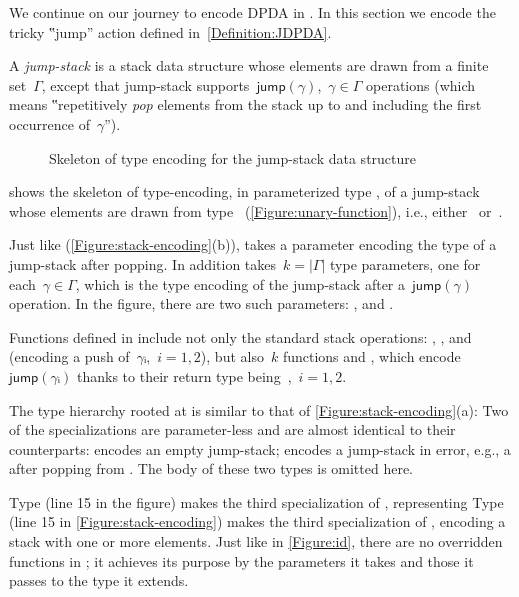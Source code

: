 We continue on our journey to encode DPDA in \Java.
In this section we encode the tricky ‟jump” action defined in~\cref{Definition:JDPDA}.

A \emph{jump-stack} is a stack data structure whose elements are drawn from a finite set~$Γ$,
  except that jump-stack supports~$\textsf{jump}(γ)$,~$γ∈Γ$ operations
  (which means ‟repetitively \emph{pop} elements from the stack up 
  to and including the first occurrence of~$γ$”).

\begin{wrapfigure}[18]{r}{42ex}
  \caption{Skeleton of type encoding for the jump-stack data structure}%
  \label{Figure:jump}%
  \lstset{style=numbered}
\end{wrapfigure}

 shows the skeleton of type-encoding, in parameterized type ,  
  of a jump-stack whose elements are drawn from type~
(\cref{Figure:unary-function}), i.e., either~ or~.

Just like  (\cref{Figure:stack-encoding}(b)),  takes 
  a  parameter encoding the type of a jump-stack after popping.
In addition  takes~$k=|Γ|$ type parameters, one for each~$γ∈Γ$,
  which is the type encoding of the jump-stack after a~$\textsf{jump}(γ)$
  operation.
In the figure, there are two such parameters: , and
  .

Functions defined in  include not only the standard stack operations: ,
,  and~ (encoding a push of~$γᵢ$,~$i=1,2$),
  but also~$k$ functions  and ,
  which encode~$\textsf{jump}(γᵢ)$
  thanks to their return type being~,~$i=1,2$.

The type hierarchy rooted at  is similar to that of
\cref{Figure:stack-encoding}(a):
Two of the specializations are parameter-less and are
  almost identical to their 
  counterparts:
 encodes an empty jump-stack;  encodes a jump-stack in error,
e.g., a after popping from .
The body of these two types is omitted here.

Type  (line 15 in the figure) makes the third specialization of , representing
Type  (line 15 in \cref{Figure:stack-encoding}) makes the third specialization of , encoding
  a stack with one or more elements.
Just like in \cref{Figure:id}, there are no overridden functions in ; it achieves
  its purpose by the parameters it takes and those it passes
  to the type it extends.

